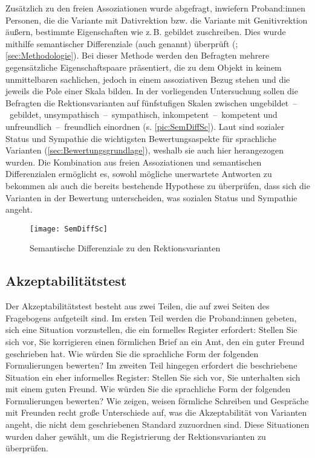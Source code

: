 Zusätzlich zu den freien Assoziationen wurde abgefragt, inwiefern Proband:innen Personen, die die Variante mit Dativrektion bzw. die Variante mit Genitivrektion äußern, bestimmte Eigenschaften wie z.\,B. \glq gebildet\grq{} zuschreiben. Dies wurde mithilfe semantischer Differenziale (auch  genannt) überprüft (\cites[s.][1255]{Garrett2005}[234]{Atteslander2010}; \autoref{sec:Methodologie}). Bei dieser Methode werden den Befragten mehrere gegensätzliche Eigenschaftspaare präsentiert, die \glqq zu dem Objekt in keinem unmittelbaren sachlichen, jedoch in einem assoziativen Bezug\grqq{} \citep[234]{Atteslander2010} stehen  und die jeweils die Pole einer Skala bilden. In der vorliegenden Untersuchung sollen die Befragten die Rektionsvarianten auf fünfstufigen Skalen zwischen ungebildet~--~gebildet, unsympathisch~--~sympathisch, inkompetent~--~kompetent und unfreundlich~--~freundlich einordnen (s. \autoref{pic:SemDiffSc}). 
Laut \citet[49]{Preston2004} sind sozialer Status und Sympathie die wichtigsten Bewertungsaspekte für sprachliche Varianten (\autoref{sec:Bewertungsgrundlage}), weshalb sie auch hier herangezogen wurden. Die Kombination aus freien Assoziationen und semantischen Differenzialen ermöglicht es, sowohl mögliche unerwartete Antworten zu bekommen als auch die bereits bestehende Hypothese zu überprüfen, dass sich die Varianten in der Bewertung unterscheiden, was sozialen Status und Sympathie angeht.  

\begin{figure}
\centering
\texttt{[image: SemDiffSc]}
\caption{Semantische Differenziale zu den Rektionsvarianten}
\label{pic:SemDiffSc}
\end{figure}

\subsection{Akzeptabilitätstest} 
\label{sec:Akz}
Der Akzeptabilitätstest besteht aus zwei Teilen, die auf zwei Seiten des Fragebogens aufgeteilt sind. 
Im ersten Teil werden die Proband:innen gebeten, sich eine Situation vorzustellen, die ein formelles Register erfordert: \glqq Stellen Sie sich vor, Sie korrigieren einen förmlichen Brief an ein Amt, den ein guter Freund geschrieben hat. 
Wie würden Sie die sprachliche Form der folgenden Formulierungen bewerten?\grqq{} Im zweiten Teil hingegen erfordert die beschriebene Situation ein eher informelles Register: \glqq Stellen Sie sich vor, Sie unterhalten sich mit einem guten Freund. 
Wie würden Sie die sprachliche Form der folgenden Formulierungen bewerten?\grqq{} 
Wie \citet[182]{Koplenig.2016} zeigen, weisen förmliche Schreiben und Gespräche mit Freunden recht große Unterschiede auf, was die Akzeptabilität von Varianten angeht, die nicht dem geschriebenen Standard zuzuordnen sind. 
Diese Situationen wurden daher gewählt, um die Registrierung der Rektionsvarianten zu überprüfen.

